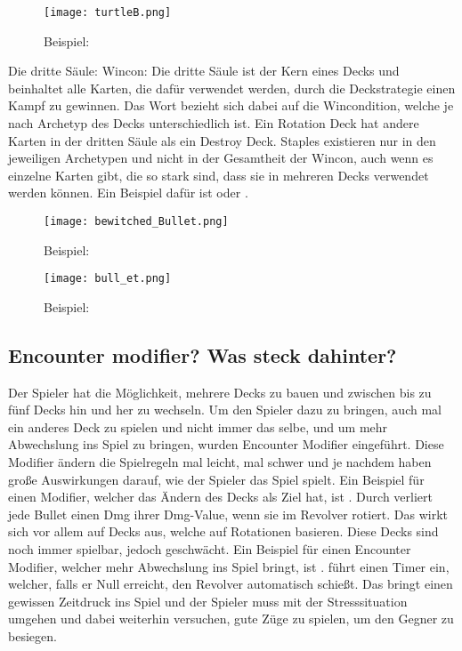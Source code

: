 \begin{figure}[H]
    \centering
    \texttt{[image: turtleB.png]}
    \caption{Beispiel: }
\end{figure}

Die dritte Säule: Wincon:
Die dritte Säule ist der Kern eines Decks und beinhaltet alle Karten, die dafür verwendet werden, durch die Deckstrategie einen Kampf zu gewinnen.
Das Wort  bezieht sich dabei auf die Wincondition, welche je nach Archetyp des Decks unterschiedlich ist.
Ein Rotation Deck hat andere Karten in der dritten Säule als ein Destroy Deck.
Staples existieren nur in den jeweiligen Archetypen
und nicht in der Gesamtheit der Wincon, auch wenn es einzelne Karten gibt, die so stark sind, dass sie in mehreren Decks verwendet werden können.
Ein Beispiel dafür ist  oder .

\begin{figure}[H]
    \centering
    \texttt{[image: bewitched\_Bullet.png]}
    \caption{Beispiel: }
\end{figure}

\begin{figure}[H]
    \centering
    \texttt{[image: bull\_et.png]}
    \caption{Beispiel: }
\end{figure}

\subsection{Encounter modifier? Was steck dahinter?}\label{subsec:placementMatters}

Der Spieler hat die Möglichkeit, mehrere Decks zu bauen und zwischen bis zu fünf Decks hin und her zu wechseln.
Um den Spieler dazu zu bringen, auch mal ein anderes Deck zu spielen und nicht immer das selbe, und um mehr
Abwechslung ins Spiel zu bringen, wurden Encounter Modifier eingeführt.
Diese Modifier ändern die Spielregeln mal leicht, mal schwer und je nachdem haben große Auswirkungen darauf, wie der Spieler das Spiel spielt.
Ein Beispiel für einen Modifier, welcher das Ändern des Decks als Ziel hat, ist . Durch  verliert jede Bullet einen Dmg ihrer Dmg-Value,
wenn sie im Revolver rotiert.
Das wirkt sich vor allem auf Decks aus, welche auf Rotationen basieren. Diese Decks sind noch immer spielbar, jedoch geschwächt.
Ein Beispiel für einen Encounter Modifier, welcher mehr Abwechslung ins Spiel bringt, ist .
 führt
einen Timer ein, welcher, falls er Null erreicht, den Revolver automatisch schießt. Das bringt einen gewissen Zeitdruck
ins Spiel und der Spieler muss mit der Stresssituation umgehen und dabei weiterhin versuchen, gute Züge zu spielen, um den Gegner zu besiegen. %

